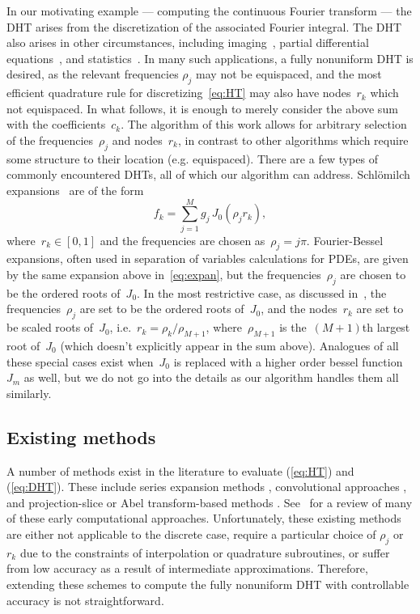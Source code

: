 In our motivating example --- computing the continuous Fourier transform --- the
DHT arises from the discretization of the associated Fourier integral. The DHT
also arises in other circumstances, including imaging~\cite{higgins1988hankel,
zhao2013fourier}, partial differential
equations~\cite{bisseling1985fast,ali1999generalized}, and
statistics~\cite{lord1954a, genton2002nonparametric}. In many such applications,
a fully nonuniform DHT is desired, as the relevant frequencies $\rho_j$ may not
be equispaced, and the most efficient quadrature rule for
discretizing~\eqref{eq:HT} may also have nodes~$r_k$ which not equispaced. In
what follows, it is enough to merely consider the above sum with the
coefficients~$c_k$. The algorithm of this work allows for arbitrary selection of
the frequencies~$\rho_j$ and nodes~$r_k$, in contrast to other algorithms which
require some structure to their location (e.g. equispaced). There are a few
types of commonly encountered DHTs, all of which our algorithm can address.
Schl\"omilch expansions~\cite{} are of the form
\begin{equation}
  \label{eq:expan}
  f_k = \sum_{j = 1}^M g_j \, J_0(\rho_j r_k),
\end{equation}
where~$r_k \in [0,1]$ and the frequencies are chosen as~$\rho_j = j\pi$.
Fourier-Bessel expansions, often used in separation of variables calculations
for PDEs, are given by the same expansion above in~\eqref{eq:expan}, but the
frequencies~$\rho_j$ are chosen to be the ordered roots of~$J_0$. In the most
restrictive case, as discussed in~\cite{johnson1987}, the frequencies~$\rho_j$
are set to be the ordered roots of~$J_0$, and the nodes~$r_k$ are set to be
scaled roots of~$J_0$, i.e.~$r_k = \rho_k/\rho_{M+1}$, where~$\rho_{M+1}$ is
the~$(M+1)$th largest root of~$J_0$ (which doesn't explicitly appear in the sum
above). Analogues of all these special cases exist when~$J_0$ is replaced with a
higher order bessel function~$J_m$ as well, but we do not go into the details as
our algorithm handles them all similarly.

\subsection*{Existing methods}
\label{sec:existing}

A number of methods exist in the literature to evaluate (\ref{eq:HT}) and
(\ref{eq:DHT}). These include series expansion methods
\cite{lord1954b,brunol1977fourier,cavanagh1979numerical}, convolutional
approaches \cite{siegman1977quasi, johansen1979fast, mook1983algorithm,
liu1999nonuniform}, and projection-slice or Abel transform-based methods
\cite{oppenheim1980computation, hansen1985fast, kapur1995algorithm}.
See~\cite{cree1993algorithms} for a review of many of these early computational
approaches. Unfortunately, these existing methods are either not applicable to
the discrete case, require a particular choice of $\rho_j$ or $r_k$ due to the
constraints of interpolation or quadrature subroutines, or suffer from low
accuracy as a result of intermediate approximations. Therefore, extending these
schemes to compute the fully nonuniform DHT with controllable accuracy is not
straightforward.

